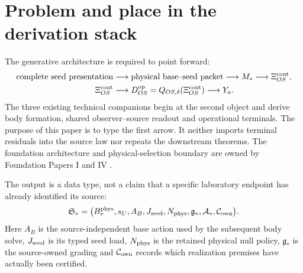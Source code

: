 \documentclass[11pt,a4paper]{article}
\theoremstyle{remark}
\begin{document}
\begin{center}
\end{center}

\section{Problem and place in the derivation stack}

The generative architecture is required to point forward:
\begin{equation}
\begin{aligned}
 \text{complete seed presentation}
 &\longrightarrow \text{physical base--seed packet}
 \longrightarrow M_*
 \longrightarrow \Xi_{OS}^{\rm cont},\\
 \Xi_{OS}^{\rm cont}
 &\longrightarrow D_{OS}^{\rm op}
 =Q_{OS,\delta}(\Xi_{OS}^{\rm cont})
 \longrightarrow Y_a.
\end{aligned}
 \label{eq:forward}
\end{equation}
The three existing technical companions begin at the second object and derive
body formation, shared observer--source readout and operational terminals.
The purpose of this paper is to type the first arrow.  It neither imports
terminal residuals into the source law nor repeats the downstream theorems.
The foundation architecture and physical-selection boundary are owned by
Foundation Papers I and IV \cite{taupaperI,taupaperIV}.

The output is a data type, not a claim that a specific laboratory endpoint has
already identified its source:
\begin{equation}
 \mathfrak S_*
 =\bigl(B_\tau^{\rm phys},s_U,A_B,J_{\rm seed},N_{\rm phys},
        \mathfrak g_*,\mathcal A_*,\mathcal C_{\rm own}\bigr).
 \label{eq:packet}
\end{equation}
Here $A_B$ is the source-independent base action used by the subsequent body
solve, $J_{\rm seed}$ is its typed seed load, $N_{\rm phys}$ is the retained
physical null policy, $\mathfrak g_*$ is the source-owned grading and
$\mathcal C_{\rm own}$ records which realization premises have actually been
certified.
\end{document}
